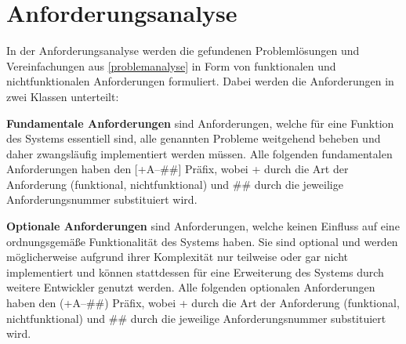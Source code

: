 \section{Anforderungsanalyse}
\label{anforderungsanalyse}
In der Anforderungsanalyse werden die gefundenen Problemlösungen und Vereinfachungen aus \autoref{problemanalyse} in Form von funktionalen und nichtfunktionalen Anforderungen formuliert. Dabei werden die Anforderungen in zwei Klassen unterteilt:
\begin{description}
	\item \textbf{Fundamentale Anforderungen} sind Anforderungen, welche für eine Funktion des Systems essentiell sind, alle genannten Probleme weitgehend beheben und daher zwangsläufig implementiert werden müssen. Alle folgenden fundamentalen Anforderungen haben den [+A--\#\#] Präfix, wobei + durch die Art der Anforderung (funktional, nichtfunktional) und \#\# durch die jeweilige Anforderungsnummer substituiert wird.
	\item \textbf{Optionale Anforderungen} sind Anforderungen, welche keinen Einfluss auf eine ordnungsgemäße Funktionalität des Systems haben. Sie sind optional und werden möglicherweise aufgrund ihrer Komplexität nur teilweise oder gar nicht implementiert und können stattdessen für eine Erweiterung des Systems durch weitere Entwickler genutzt werden. Alle folgenden optionalen Anforderungen haben den (+A--\#\#) Präfix, wobei + durch die Art der Anforderung (funktional, nichtfunktional) und \#\# durch die jeweilige Anforderungsnummer substituiert wird.
\end{description}

\newcommand{\CalculatePercentage}[2]{%
\setcounter{z}{#1 * 100 / #2}%
\arabic{z} Prozent%
}%

\newcommand*{\reqautorefname}{Anforderung}

\edef\fullreqs{}


